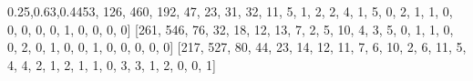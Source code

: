 \documentclass[
]{article}
\newenvironment{Shaded}{}{}
\newcommand{\DecValTok}[1]{\textcolor[rgb]{0.25,0.63,0.44}{#1}}
\newcommand{\NormalTok}[1]{#1}
\begin{document}
\begin{Shaded}
\begin{Highlighting}[]
\NormalTok{[}\DecValTok{53}\NormalTok{, }\DecValTok{126}\NormalTok{, }\DecValTok{460}\NormalTok{, }\DecValTok{192}\NormalTok{, }\DecValTok{47}\NormalTok{, }\DecValTok{23}\NormalTok{, }\DecValTok{31}\NormalTok{, }\DecValTok{32}\NormalTok{, }\DecValTok{11}\NormalTok{, }\DecValTok{5}\NormalTok{, }\DecValTok{1}\NormalTok{, }\DecValTok{2}\NormalTok{, }\DecValTok{2}\NormalTok{, }\DecValTok{4}\NormalTok{, }\DecValTok{1}\NormalTok{, }\DecValTok{5}\NormalTok{, }\DecValTok{0}\NormalTok{, }\DecValTok{2}\NormalTok{, }\DecValTok{1}\NormalTok{, }\DecValTok{1}\NormalTok{, }\DecValTok{0}\NormalTok{, }\DecValTok{0}\NormalTok{, }\DecValTok{0}\NormalTok{, }\DecValTok{0}\NormalTok{, }\DecValTok{0}\NormalTok{, }\DecValTok{1}\NormalTok{, }\DecValTok{0}\NormalTok{, }\DecValTok{0}\NormalTok{, }\DecValTok{0}\NormalTok{, }\DecValTok{0}\NormalTok{]}
\NormalTok{[}\DecValTok{261}\NormalTok{, }\DecValTok{546}\NormalTok{, }\DecValTok{76}\NormalTok{, }\DecValTok{32}\NormalTok{, }\DecValTok{18}\NormalTok{, }\DecValTok{12}\NormalTok{, }\DecValTok{13}\NormalTok{, }\DecValTok{7}\NormalTok{, }\DecValTok{2}\NormalTok{, }\DecValTok{5}\NormalTok{, }\DecValTok{10}\NormalTok{, }\DecValTok{4}\NormalTok{, }\DecValTok{3}\NormalTok{, }\DecValTok{5}\NormalTok{, }\DecValTok{0}\NormalTok{, }\DecValTok{1}\NormalTok{, }\DecValTok{1}\NormalTok{, }\DecValTok{0}\NormalTok{, }\DecValTok{0}\NormalTok{, }\DecValTok{2}\NormalTok{, }\DecValTok{0}\NormalTok{, }\DecValTok{1}\NormalTok{, }\DecValTok{0}\NormalTok{, }\DecValTok{0}\NormalTok{, }\DecValTok{1}\NormalTok{, }\DecValTok{0}\NormalTok{, }\DecValTok{0}\NormalTok{, }\DecValTok{0}\NormalTok{, }\DecValTok{0}\NormalTok{, }\DecValTok{0}\NormalTok{]}
\NormalTok{[}\DecValTok{217}\NormalTok{, }\DecValTok{527}\NormalTok{, }\DecValTok{80}\NormalTok{, }\DecValTok{44}\NormalTok{, }\DecValTok{23}\NormalTok{, }\DecValTok{14}\NormalTok{, }\DecValTok{12}\NormalTok{, }\DecValTok{11}\NormalTok{, }\DecValTok{7}\NormalTok{, }\DecValTok{6}\NormalTok{, }\DecValTok{10}\NormalTok{, }\DecValTok{2}\NormalTok{, }\DecValTok{6}\NormalTok{, }\DecValTok{11}\NormalTok{, }\DecValTok{5}\NormalTok{, }\DecValTok{4}\NormalTok{, }\DecValTok{4}\NormalTok{, }\DecValTok{2}\NormalTok{, }\DecValTok{1}\NormalTok{, }\DecValTok{2}\NormalTok{, }\DecValTok{1}\NormalTok{, }\DecValTok{1}\NormalTok{, }\DecValTok{0}\NormalTok{, }\DecValTok{3}\NormalTok{, }\DecValTok{3}\NormalTok{, }\DecValTok{1}\NormalTok{, }\DecValTok{2}\NormalTok{, }\DecValTok{0}\NormalTok{, }\DecValTok{0}\NormalTok{, }\DecValTok{1}\NormalTok{]}
\end{Highlighting}
\end{Shaded}
\end{document}
